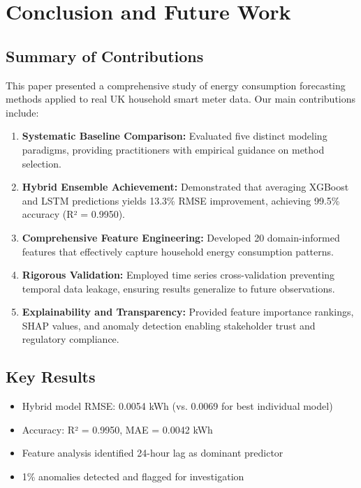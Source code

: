 \documentclass[11pt, a4paper, oneside]{article}
\begin{document}
\newpage


\section{Conclusion and Future Work}
\label{sec:conclusion}

\subsection{Summary of Contributions}

This paper presented a comprehensive study of energy consumption forecasting methods applied to real UK household smart meter data. Our main contributions include:

\begin{enumerate}
    \item \textbf{Systematic Baseline Comparison:} Evaluated five distinct modeling paradigms, providing practitioners with empirical guidance on method selection.
    
    \item \textbf{Hybrid Ensemble Achievement:} Demonstrated that averaging XGBoost and LSTM predictions yields 13.3\% RMSE improvement, achieving 99.5\% accuracy (R² = 0.9950).
    
    \item \textbf{Comprehensive Feature Engineering:} Developed 20 domain-informed features that effectively capture household energy consumption patterns.
    
    \item \textbf{Rigorous Validation:} Employed time series cross-validation preventing temporal data leakage, ensuring results generalize to future observations.
    
    \item \textbf{Explainability and Transparency:} Provided feature importance rankings, SHAP values, and anomaly detection enabling stakeholder trust and regulatory compliance.
\end{enumerate}

\subsection{Key Results}

\begin{itemize}
    \item Hybrid model RMSE: 0.0054 kWh (vs. 0.0069 for best individual model)
    \item Accuracy: R² = 0.9950, MAE = 0.0042 kWh
    \item Feature analysis identified 24-hour lag as dominant predictor
    \item 1\% anomalies detected and flagged for investigation
\end{itemize}
\end{document}
